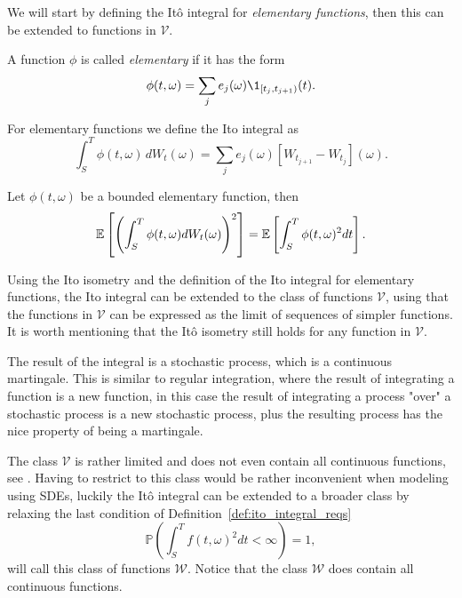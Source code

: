 We will start by defining the Itô integral for \textit{elementary functions},
then this can be extended to functions in $\mathcal{V}$.

\begin{definition}
    A function $\phi$ is called \textit{elementary} if it has the form
    \begin{equation*}
        \phi(t, \omega) = \sum_{j} e_j(\omega) \1_{[t_j, t_{j + 1})}(t).
    \end{equation*}
\end{definition}

For elementary functions we define the Ito integral as
\begin{equation*}
    \int^{T}_{S} \phi(t, \omega)\, dW_t(\omega) = \sum_{j} e_j(\omega) \left[ W_{t_{j + 1}} - W_{t_{j}} \right] (\omega).
\end{equation*}

\begin{lemma}
    Let $\phi(t, \omega)$ be a bounded elementary function, then
    \begin{equation*}
        \mathbb{E} \left[ \left( \int^{T}_{S} \phi(t, \omega) dW_t (\omega) \right)^2 \right]
            = \mathbb{E} \left[ \int^{T}_{S} \phi(t, \omega)^2 dt \right].
    \end{equation*}
\end{lemma}

Using the Ito isometry and the definition of the Ito integral for elementary functions,
the Ito integral can be extended to the class of functions $\mathcal{V}$,
using that the functions in $\mathcal{V}$ can be expressed as the limit of sequences of simpler functions.
It is worth mentioning that the Itô isometry still holds for any function in $\mathcal{V}$.

The result of the integral is a stochastic process,
which is a continuous martingale.
This is similar to regular integration, where the result of integrating a function is a new function,
in this case the result of integrating a process "over" a stochastic process is a new stochastic process,
plus the resulting process has the nice property of being a martingale.

The class $\mathcal{V}$ is rather limited and does not even contain all continuous functions, see \cite{steele_stochastic}.
Having to restrict to this class would be rather inconvenient when modeling using SDEs,
luckily the Itô integral can be extended to a broader class by relaxing the last condition of Definition~\ref{def:ito_integral_reqs}
\begin{equation*}
    \mathbb{P} \left( \int^{T}_{S} f(t, \omega)^2 dt < \infty \right) = 1,
\end{equation*}
will call this class of functions $\mathcal{W}$.
Notice that the class $\mathcal{W}$ does contain all continuous functions.


